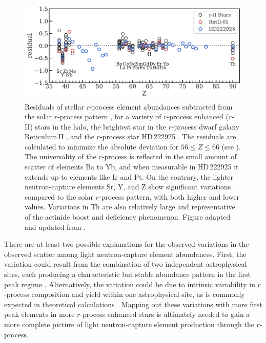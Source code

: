 \documentclass[letterpaper]{article}
\begin{document}
\begin{figure}
\centering
    \includegraphics[width=0.9\linewidth]{figures/rIIstar_residuals.pdf}
    \caption{Residuals of stellar $r$-process element abundances subtracted from the solar $r$-process pattern \citep{Burris00}, for a variety of $r$-process enhanced ($r$-II) stars in the halo, the brightest star in the $r$-process dwarf galaxy Reticulum\,II \citep{Ji2018}, and the $r$-process  star HD\,222925 \citep{Roederer2022}.
    The residuals are calculated to minimize the absolute deviation for $56 \leq Z \leq 66$ (see \citealt{Ji2016c}).
    The universality of the $r$-process is reflected in the small amount of scatter of elements Ba to Yb, and when measurable in HD\,222925 it extends up to elements like Ir and Pt. On the contrary, the lighter neutron-capture elements Sr, Y, and Z show significant variations compared to the solar $r$-process pattern, with both higher and lower values.
    Variations in Th are also relatively large and representative of the actinide boost and deficiency phenomenon. Figure adapted and updated from \citet{Ji2016c}.}
    \label{fig:srresid}
\end{figure}

There are at least two possible explanations for the observed variations in the observed scatter among light neutron-capture element abundances.
First, the variation could result from the combination of two independent astrophysical sites, each producing a characteristic but stable abundance pattern in the first peak regime \citep[e.g.,][]{Travaglio04,Honda07,Montes07,SiqueiraMello2014,Shibagaki16}.
Alternatively, the variation could be due to intrinsic variability in $r$-process composition and yield within one astrophysical site, as is commonly expected in theoretical calculations  \citep[e.g.,][]{Wanajo14,Just15,Nishimura2015,Radice16,Wu2016}.
Mapping out these variations with more first peak elements in more $r$-process enhanced stars is ultimately needed to gain a more complete picture of light neutron-capture element production through the $r$-process.
\end{document}
